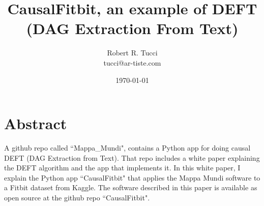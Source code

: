 \documentclass[12pt]{article}
\begin{document}
\title{CausalFitbit, an example of DEFT (DAG Extraction From Text)}
\date{ \today}
\author{Robert R. Tucci\\
        tucci@ar-tiste.com}
\maketitle
\vskip2cm
\section*{Abstract}
A github repo called ``Mappa\_Mundi", contains a Python app for
doing causal DEFT (DAG Extraction from Text).
That repo includes a white paper explaining the
DEFT algorithm and the app that implements it.
In this white paper, I 
explain the Python app ``CausalFitbit"
that applies the  Mappa Mundi software  to 
a Fitbit dataset from Kaggle.
The software described in this paper
is available as open source at the github repo
``CausalFitbit".

\newpage
\end{document}
